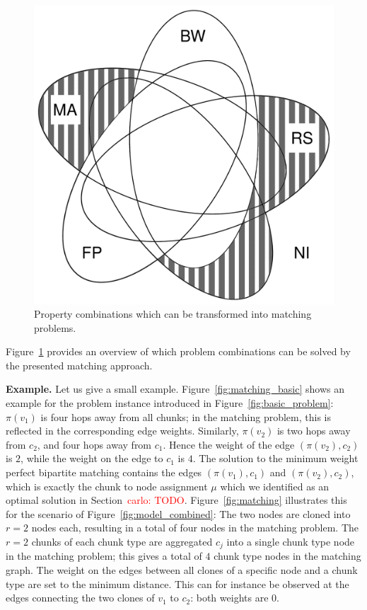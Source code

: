 \documentclass[9pt,twocolumn]{scrartcl}
\newcommand{\carlo}[1]{\textcolor{red}{carlo: #1}}
\newcommand{\MaFactor}{r}
\newcommand{\RedundancyFactor}{\ensuremath{r}}
\newcommand{\VmChunkAssignment}{\mu}
\newcommand{\NodeMapping}{\pi}
\newcommand{\VirtualNode}{v}
\newcommand{\achunk}{\ensuremath{c}}
\begin{document}
\begin{figure}
\includegraphics[width=\columnwidth]{figs/venn_matching.pdf}
\caption{Property combinations which can be transformed into matching problems.}
\label{fig:venn_matching}
\end{figure}

Figure~\ref{fig:venn_matching} provides an overview of 
which problem combinations can be solved by the presented matching approach.


\textbf{Example.} Let us give a small example.
Figure~\ref{fig:matching_basic} shows an example for the problem instance introduced in
Figure~\ref{fig:basic_problem}: $\NodeMapping(\VirtualNode_1)$ is four hops
away from all chunks; in the matching problem, this is
reflected in the corresponding edge
weights. Similarly, $\NodeMapping(\VirtualNode_2)$ is
two hops away from $\achunk_2$, and four hops away from $\achunk_1$. Hence the
weight of the edge $(\NodeMapping(\VirtualNode_2),\achunk_2)$ is $2$, while the
weight on the edge to $\achunk_1$ is $4$. The solution to the minimum weight
perfect bipartite matching contains the edges $(\NodeMapping(\VirtualNode_1),
\achunk_1)$ and $(\NodeMapping(\VirtualNode_2),
\achunk_2)$, which is exactly the chunk to node assignment $\VmChunkAssignment$
which we identified as an optimal solution in Section~\carlo{TODO}.
Figure~\ref{fig:matching} illustrates this for the scenario of
Figure~\ref{fig:model_combined}: The two nodes are
cloned into $\MaFactor = 2$ nodes each, resulting in a total of four nodes in
the matching problem. The $\RedundancyFactor = 2$ chunks of each chunk type are
aggregated $\achunk_j$ into a single chunk type node in the matching problem;
this gives a total of $4$ chunk type nodes in the matching graph. The weight
on the edges between all clones of a specific node and a chunk type are set to
the minimum distance. This can for instance be observed at the edges connecting
the two clones of $\VirtualNode_1$ to $\achunk_2$: both weights are 0.
\end{document}

